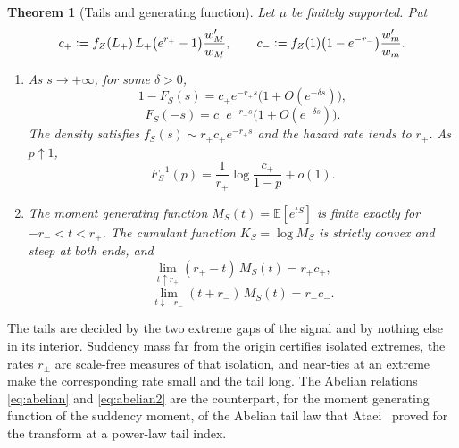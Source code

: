 \documentclass[sn-mathphys-num]{sn-jnl}\newcommand{\SNJNL}{}
\theoremstyle{thmstyleone}
\newtheorem{theorem}{Theorem}
\theoremstyle{thmstyletwo}
\theoremstyle{thmstylethree}
\theoremstyle{thmstyleone}
\providecommand{\E}{\mathbb{E}}
\providecommand{\eqdef}{\mathrel{\vcentcolon=}}
\begin{document}
	\begin{theorem}[Tails and generating function]
		\label{thm:tails}
		Let $\mu$ be finitely supported. Put
		\begin{equation}\label{eq:tailconstants}
			c_+\eqdef f_Z(L_+)\,L_+\bigl(e^{r_+}-1\bigr)\frac{w_M'}{w_M},
			\qquad
			c_-\eqdef f_Z(1)\bigl(1-e^{-r_-}\bigr)\frac{w_m'}{w_m}.
		\end{equation}
		\begin{enumerate}[label=\textup{(\roman*)},leftmargin=2.2em]
			\item As $s\to+\infty$, for some $\delta>0$,
			\begin{equation}\label{eq:tails}
				1-F_S(s)=c_+e^{-r_+s}\bigl(1+O(e^{-\delta s})\bigr),
			\end{equation}
			\begin{equation}\label{eq:tails2}
				F_S(-s)=c_-e^{-r_-s}\bigl(1+O(e^{-\delta s})\bigr).
			\end{equation}
			The density satisfies $f_S(s)\sim r_+c_+e^{-r_+s}$ and the hazard
			rate tends to $r_+$. As $p\uparrow1$,
			\begin{equation}\label{eq:tailquantile}
				F_S^{-1}(p)=\frac{1}{r_+}\log\frac{c_+}{1-p}+o(1).
			\end{equation}
			\item The moment generating function $M_S(t)=\E[e^{tS}]$ is finite
			exactly for $-r_-<t<r_+$. The cumulant function $K_S=\log M_S$
			is strictly convex and steep at both ends, and
			\begin{equation}\label{eq:abelian}
				\lim_{t\uparrow r_+}(r_+-t)\,M_S(t)=r_+c_+,
			\end{equation}
			\begin{equation}\label{eq:abelian2}
				\lim_{t\downarrow-r_-}(t+r_-)\,M_S(t)=r_-c_- .
			\end{equation}
			
		\end{enumerate}
	\end{theorem}
	
	The tails are decided by the two extreme gaps of the signal and by
	nothing else in its interior. Suddency mass far from the origin
	certifies isolated extremes, the rates $r_\pm$ are scale-free
	measures of that isolation, and near-ties at an extreme make the
	corresponding rate small and the tail long. The Abelian relations \eqref{eq:abelian} and \eqref{eq:abelian2}
	are the counterpart, for
	the moment generating function of the suddency moment, of the
	Abelian tail law that Ataei~\cite{ataei2026} proved for the transform
	at a power-law tail index.
	
\end{document}
